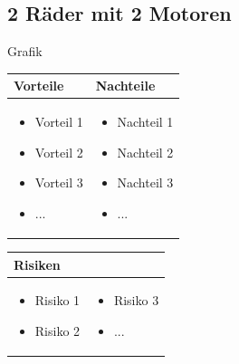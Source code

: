 \subsection{2 Räder mit 2 Motoren}

Grafik

\begin{table}[h]
\begin{tabular}{p{} | p{}}


 \textbf{Vorteile} & \textbf{Nachteile} \\ \hline
	 
\begin{itemize}
\item Vorteil 1
\item Vorteil 2
\item Vorteil 3
\item ...
\end{itemize}

 
 &
 
\begin{itemize}
\item Nachteil 1
\item Nachteil 2
\item Nachteil 3
\item ...
\end{itemize}

\end{tabular}
\end{table}

\begin{table}[h]
\begin{tabular}{p{}p{}}


 \textbf{Risiken} & \\ \hline
	 
\begin{itemize}
\item Risiko 1
\item Risiko 2
\end{itemize}
&
\begin{itemize}
\item Risiko 3
\item ...
\end{itemize}

 
\end{tabular}
\end{table}

\pagebreak